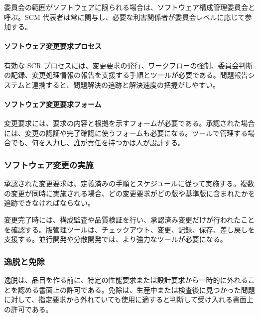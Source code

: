 委員会の範囲がソフトウェアに限られる場合は、ソフトウェア構成管理委員会と呼ぶ。SCM 代表者は常に関与し、必要な利害関係者が委員会レベルに応じて参加する。

\paragraph*{ソフトウェア変更要求プロセス}
有効な SCR プロセスには、変更要求の発行、ワークフローの強制、委員会判断の記録、変更処理情報の報告を支援する手順とツールが必要である。問題報告システムと連携すると、問題解決の追跡と解決速度の把握がしやすい。

\paragraph*{ソフトウェア変更要求フォーム}
変更要求には、要求の内容と根拠を示すフォームが必要である。承認された場合には、変更の認証や完了確認に使うフォームも必要になる。ツールで管理する場合でも、何を入力し、誰が責任を持つかは人が設計する。

\subsubsection*{ソフトウェア変更の実施}
承認された変更要求は、定義済みの手順とスケジュールに従って実施する。複数の変更が同時に実施される場合、どの変更要求がどの版や基準版に含まれたかを追跡できなければならない。

変更完了時には、構成監査や品質検証を行い、承認済み変更だけが行われたことを確認する。版管理ツールは、チェックアウト、変更、記録、保存、差し戻しを支援する。並行開発や分散開発では、より強力なツールが必要になる。

\subsubsection*{逸脱と免除}
逸脱は、品目を作る前に、特定の性能要求または設計要求から一時的に外れることを認める書面上の許可である。免除は、生産中または検査後に見つかった問題に対して、指定要求から外れていても使用に適すると判断して受け入れる書面上の許可である。

